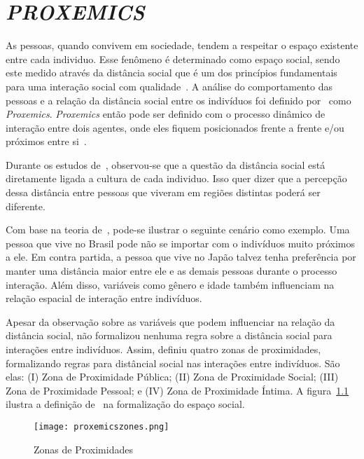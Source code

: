\chapter{\emph{PROXEMICS}}
\label{cap:proxemics}
As pessoas, quando convivem em sociedade, tendem a respeitar o espaço existente entre cada individuo. Esse fenômeno é determinado como espaço social, sendo este medido através da distância social que é um dos princípios fundamentais para uma interação social com qualidade~\cite{Hall:1969, Henkel:2014}. A análise do comportamento das pessoas e a relação da distância social entre os indivíduos foi definido por~ como \emph{Proxemics}. \emph{Proxemics} então pode ser definido com o processo dinâmico de interação entre dois agentes, onde eles fiquem posicionados frente a frente e/ou próximos entre si~\cite{Mead:2011b}.

Durante os estudos de~, observou-se que a questão da distância social está diretamente ligada a cultura de cada individuo. Isso quer dizer que a percepção dessa distância entre pessoas que viveram em regiões distintas poderá ser diferente.

Com base na teoria de~, pode-se ilustrar o seguinte cenário como exemplo. Uma pessoa que vive no Brasil pode não se importar com o indivíduos muito próximos a ele. Em contra partida, a pessoa que vive no Japão talvez tenha preferência por manter uma distância maior entre ele e as demais pessoas durante o processo interação. Além disso, variáveis como gênero e idade também influenciam na relação espacial de interação entre indivíduos.

Apesar da observação sobre as variáveis que podem influenciar na relação da distância social,  não formalizou nenhuma regra sobre a distância social para interações entre indivíduos. Assim,  definiu quatro zonas de proximidades, formalizando regras para distâncial social nas interações entre indivíduos. São elas: (I) Zona de Proximidade Pública; (II) Zona de Proximidade Social; (III) Zona de Proximidade Pessoal; e (IV) Zona de Proximidade Íntima. A figura~\ref{fig:proximityzones} ilustra a definição de~ na formalização do espaço social.

\begin{figure}[ht!]
	\centering
	\caption{Zonas de Proximidades}
	\texttt{[image: proxemicszones.png]}
	\label{fig:proximityzones}
\end{figure}

